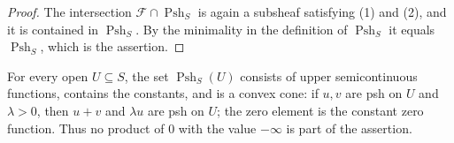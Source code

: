 \begin{proof}
The intersection $\mathscr F\cap\operatorname{Psh}_S$ is again a subsheaf
satisfying (1) and (2), and it is contained in $\operatorname{Psh}_S$.  By
the minimality in the definition of $\operatorname{Psh}_S$ it equals
$\operatorname{Psh}_S$, which is the assertion.
\end{proof}

\begin{proposition}
\label{prop:ch15-psh-cone}
For every open $U\subseteq S$, the set $\operatorname{Psh}_S(U)$ consists of
upper semicontinuous functions, contains the constants, and is a convex cone:
if $u,v$ are psh on $U$ and $\lambda>0$, then $u+v$ and $\lambda u$ are
psh on $U$; the zero element is the constant zero function.  Thus no
product of $0$ with the value $-\infty$ is part of the assertion.
\end{proposition}

